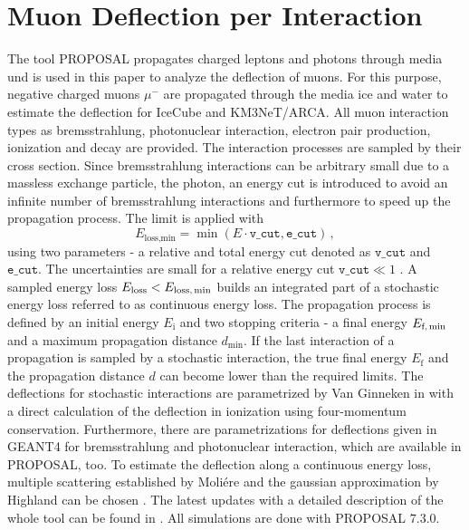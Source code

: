 \section{Muon Deflection per Interaction}\label{sec:defl_per_int}
The tool PROPOSAL propagates charged leptons and photons through media und is 
used in this paper to analyze the deflection of muons. For this purpose, 
negative charged muons $\mu^-$ are propagated through the media ice and water 
to estimate the deflection for IceCube and KM3NeT/ARCA. All muon interaction types as bremsstrahlung, photonuclear interaction, electron pair production, 
ionization and decay are provided. The interaction processes are sampled by their cross section. Since bremsstrahlung interactions can be 
arbitrary small due to a massless exchange particle, the photon, an energy cut is introduced to avoid an infinite number of bremsstrahlung interactions 
and furthermore to speed up the propagation process. 
The limit is applied with 
\begin{equation}
    E_{\text{loss,min}} = \min{(E \cdot \texttt{v\_cut}, \texttt{e\_cut})}\,,
\end{equation}
using two parameters - a relative and total energy cut denoted as 
$\texttt{v\_cut}$ and $\texttt{e\_cut}$. The uncertainties are small 
for a relative energy cut $\texttt{v\_cut}\ll 1$ \cite{}.
A sampled energy loss 
$E_{\text{loss}} < E_{\text{loss,\,min}}$ builds an integrated part of a 
stochastic energy loss referred to as continuous energy loss. The 
propagation process is defined by an initial energy $E_{\text{i}}$ and 
two stopping criteria - a final energy $E_{\text{f,\,min}}$ and a 
maximum propagation distance $d_{\text{min}}$. If the last interaction of 
a propagation is sampled by a stochastic interaction, the true final energy 
$E_{\text{f}}$ and the 
propagation distance $d$ can become lower than the required limits. 
The deflections for stochastic interactions are parametrized by Van Ginneken 
in \cite{Van_Ginneken} with a direct calculation of the deflection in 
ionization using four-momentum conservation. 
Furthermore, there are parametrizations for deflections given in GEANT4 \cite{GEANT4_manual} for bremsstrahlung and photonuclear interaction, which 
are available in PROPOSAL, too.
To estimate the deflection along 
a continuous energy loss, multiple scattering established by Moliére 
\cite{moliere_scattering} and the gaussian approximation by Highland 
can be chosen \cite{HIGHLAND_1975}. 
The latest updates with a detailed description of the whole tool can be found 
in \cite{phd_soedingrekso}.
All simulations are done with PROPOSAL $7.3.0$.


